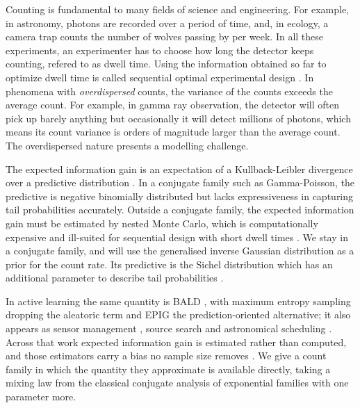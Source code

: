 \documentclass[twoside]{article}
\theoremstyle{plain}
\theoremstyle{definition}
\theoremstyle{remark}
\begin{document}
Counting is fundamental to many fields of science and engineering. For example, in astronomy, photons are recorded over a period of time, and, in ecology, a camera trap counts the number of wolves passing by per week. In all these experiments, an experimenter has to choose how long the detector keeps counting, refered to as dwell time. Using the information obtained so far to optimize dwell time is called sequential optimal experimental design \citep{lindley1956measure,chaloner1995bayesian}. In phenomena with \emph{overdispersed} counts, the variance of the counts exceeds the average count. For example, in gamma ray observation, the detector will often pick up barely anything but occasionally it will detect millions of photons, which means its count variance is orders of magnitude larger than the average count. The overdispersed nature presents a modelling challenge.

The expected information gain is an expectation of a Kullback-Leibler divergence over a predictive distribution \citep{ryan2016review,huan2024optimal}. In a conjugate family such as Gamma-Poisson, the predictive is negative binomially distributed but lacks expressiveness in capturing tail probabilities accurately. Outside a conjugate family, the expected information gain must be estimated by nested Monte Carlo, which is computationally expensive and ill-suited for sequential design with short dwell times \citep{rainforth2018nesting,rainforth2024modern}. We stay in a conjugate family, and will use the generalised inverse Gaussian distribution \citep{jorgensen1982statistical} as a prior for the count rate. Its predictive is the Sichel distribution which has an additional parameter to describe tail probabilities \citep{sichel1975distribution,stein1987parameter}.

In active learning the same quantity is BALD \citep{houlsby2011bald}, with maximum entropy sampling \citep{sebastiani2000maximum} dropping the aleatoric term and EPIG \citep{smith2023prediction} the prediction-oriented alternative; it also appears as sensor management \citep{kreucher2005sensor,hero2008information,yu2009active}, source search \citep{vergassola2007infotaxis,hutchinson2018entrotaxis} and astronomical scheduling \citep{loredo2004bayesian}.
Across that work expected information gain is estimated rather than computed, and those estimators carry a bias no sample size removes \citep{rainforth2024modern}.
We give a count family in which the quantity they approximate is available directly, taking a mixing law from the classical conjugate analysis of exponential families \citep{diaconis1979conjugate,gutierrez1997exponential,chen2003conjugate} with one parameter more.
\end{document}
